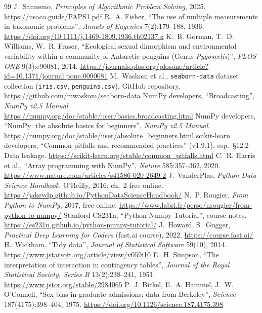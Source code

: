 \begin{thebibliography}{99}
 J.~Sannemo, \emph{Principles of Algorithmic Problem Solving}, 2025. \url{https://usaco.guide/PAPS1.pdf}
 R.~A. Fisher, ``The use of multiple measurements in taxonomic problems'', \emph{Annals of Eugenics} 7(2):179--188, 1936. \url{https://doi.org/10.1111/j.1469-1809.1936.tb02137.x}
 K.~B. Gorman, T.~D. Williams, W.~R. Fraser, ``Ecological sexual dimorphism and environmental variability within a community of Antarctic penguins (Genus \emph{Pygoscelis})'', \emph{PLOS ONE} 9(3):e90081, 2014. \url{https://journals.plos.org/plosone/article?id=10.1371/journal.pone.0090081}
 M.~Waskom et al., \texttt{seaborn-data} dataset collection (\texttt{iris.csv}, \texttt{penguins.csv}), GitHub repository. \url{https://github.com/mwaskom/seaborn-data}
 NumPy developers, ``Broadcasting'', \emph{NumPy v2.5 Manual}. \url{https://numpy.org/doc/stable/user/basics.broadcasting.html}
 NumPy developers, ``NumPy: the absolute basics for beginners'', \emph{NumPy v2.5 Manual}. \url{https://numpy.org/doc/stable/user/absolute_beginners.html}
 scikit-learn developers, ``Common pitfalls and recommended practices'' (v1.9.1), esp.~§12.2 Data leakage. \url{https://scikit-learn.org/stable/common_pitfalls.html}
 C.~R. Harris et al., ``Array programming with NumPy'', \emph{Nature} 585:357--362, 2020. \url{https://www.nature.com/articles/s41586-020-2649-2}
 J.~VanderPlas, \emph{Python Data Science Handbook}, O'Reilly, 2016; ch.~2 free online. \url{https://jakevdp.github.io/PythonDataScienceHandbook/}
 N.~P. Rougier, \emph{From Python to NumPy}, 2017, free online. \url{https://www.labri.fr/perso/nrougier/from-python-to-numpy/}
 Stanford CS231n, ``Python Numpy Tutorial'', course notes. \url{https://cs231n.github.io/python-numpy-tutorial/}
 J.~Howard, S.~Gugger, \emph{Practical Deep Learning for Coders} (fast.ai course), 2022. \url{https://course.fast.ai/}
 H.~Wickham, ``Tidy data'', \emph{Journal of Statistical Software} 59(10), 2014. \url{https://www.jstatsoft.org/article/view/v059i10}
 E.~H. Simpson, ``The interpretation of interaction in contingency tables'', \emph{Journal of the Royal Statistical Society, Series B} 13(2):238--241, 1951. \url{https://www.jstor.org/stable/2984065}
 P.~J. Bickel, E.~A. Hammel, J.~W. O'Connell, ``Sex bias in graduate admissions: data from Berkeley'', \emph{Science} 187(4175):398--404, 1975. \url{https://doi.org/10.1126/science.187.4175.398}

\end{thebibliography}
